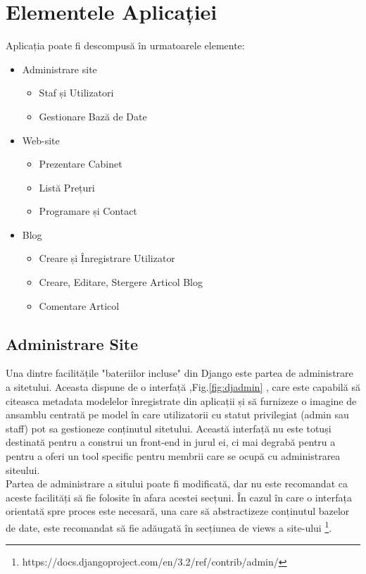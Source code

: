\documentclass[11pt]{scrartcl} %
\begin{document}
\section{Elementele Aplicației}

Aplicația poate fi descompusă în urmatoarele elemente:


\begin{itemize}
	\item Administrare site
		\begin{itemize}
			\item Staf și Utilizatori
			\item Gestionare Bază de Date
		\end{itemize}
	\item Web-site
		\begin{itemize}
			\item Prezentare Cabinet
			\item Listă Prețuri
			\item Programare și Contact
		\end{itemize}
	\item Blog
		\begin{itemize}
			\item Creare și Înregistrare Utilizator
			\item Creare, Editare, Stergere Articol Blog
			\item Comentare Articol
		\end{itemize}
\end{itemize}


\subsection{Administrare Site}


Una dintre facilitățile "bateriilor incluse" din Django este partea de administrare a sitetului. Aceasta dispune de o interfață ,Fig.\ref{fig:djadmin} , care este capabilă să citeasca metadata modelelor înregistrate din aplicații și să furnizeze o imagine de ansamblu centrată pe model în care utilizatorii cu statut privilegiat (admin sau staff) pot sa gestioneze conținutul sitetului. Această interfață nu este totuși destinată pentru a construi un front-end in jurul ei, ci mai degrabă pentru a pentru a oferi un tool specific pentru membrii care se ocupă cu administrarea siteului.\\
Partea de administrare a sitului poate fi modificată, dar nu este recomandat ca aceste facilități să fie folosite în afara acestei secțuni. În cazul în care o interfața orientată spre proces este necesară, una care să abstractizeze conținutul bazelor de date, este recomandat să fie adăugată în secțiunea de views a site-ului \footnote{https://docs.djangoproject.com/en/3.2/ref/contrib/admin/}. 
\end{document}

